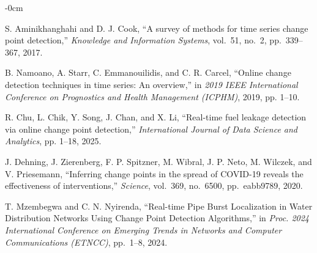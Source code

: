 \documentclass[journal,article,submit,pdftex,moreauthors]{Definitions/mdpi}
\begin{document}
\begin{adjustwidth}{-\extralength}{0cm}


% 


\begin{thebibliography}{999}

S. Aminikhanghahi and D. J. Cook,
``A survey of methods for time series change point detection,''
\textit{Knowledge and Information Systems}, vol.~51, no.~2, pp.~339--367, 2017.

B. Namoano, A. Starr, C. Emmanouilidis, and C. R. Carcel, ``Online change detection techniques in time series: An overview,'' in \emph{2019 IEEE International Conference on Prognostics and Health Management (ICPHM)}, 2019, pp. 1--10.

R. Chu, L. Chik, Y. Song, J. Chan, and X. Li, ``Real-time fuel leakage detection via online change point detection,'' \emph{International Journal of Data Science and Analytics}, pp. 1--18, 2025.

J. Dehning, J. Zierenberg, F. P. Spitzner, M. Wibral, J. P. Neto, M. Wilczek, and V. Priesemann,
``Inferring change points in the spread of COVID-19 reveals the effectiveness of interventions,''
\textit{Science}, vol.~369, no.~6500, pp.~eabb9789, 2020.

T. Mzembegwa and C. N. Nyirenda,
``Real-time Pipe Burst Localization in Water Distribution Networks Using Change Point Detection Algorithms,''
in \textit{Proc. 2024 International Conference on Emerging Trends in Networks and Computer Communications (ETNCC)}, pp.~1--8, 2024.


\end{thebibliography}
\end{adjustwidth}
\end{document}

